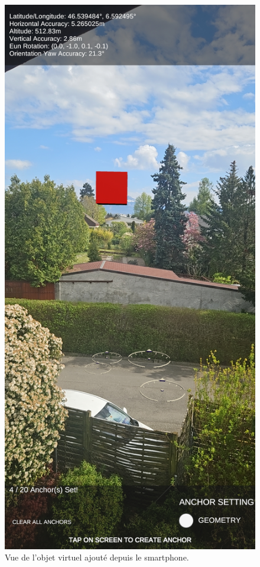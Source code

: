 \begin{figure}[H]
    \centering
    \includegraphics[width=0.5\linewidth]{assets/figures/Screenshots/geospatial example.jpg}
    \caption{Vue de l'objet virtuel ajouté depuis le smartphone.}
    \label{fig:GeoSample}
\end{figure}


\newpage
